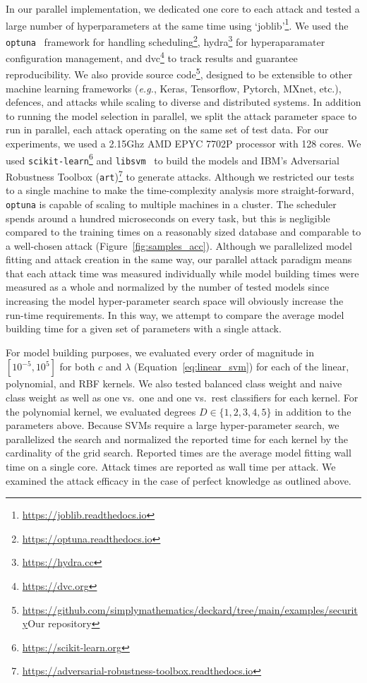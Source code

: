 \documentclass[fonts]{icst}
\begin{document}
In our parallel implementation, we dedicated one core to each attack and tested a large number of hyperparameters at the same time using `joblib'\footnote{\href{https://joblib.readthedocs.io}{https://joblib.readthedocs.io}}. We used the \texttt{optuna}~\cite{optuna} framework for handling scheduling\footnote{\href{https://optuna.readthedocs.io}{https://optuna.readthedocs.io}}, hydra\footnote{\href{https://hydra.cc}{https://hydra.cc}} for hyperaparamater configuration management, and dvc\footnote{\href{https://dvc.org}{https://dvc.org}} to track results and guarantee reproducibility. We also provide source code\footnote{\href{https://github.com/simplymathematics/deckard/}{https://github.com/simplymathematics/deckard/tree/main/examples/security}{Our repository}}, designed to be extensible to other machine learning frameworks (\textit{e.g.}, Keras, Tensorflow, Pytorch, MXnet, etc.), defences, and attacks while scaling to diverse and distributed systems. In addition to running the model selection in parallel, we split the attack parameter space to run in parallel, each attack operating on the same set of test data. For our experiments, we used a 2.15Ghz AMD EPYC 7702P processor with 128 cores. We used \texttt{scikit-learn}\footnote{\href{https://scikit-learn.org/}{https://scikit-learn.org}} and \texttt{libsvm}~\cite{chang2011libsvm} to build the models and IBM's Adversarial Robustness Toolbox (\texttt{art})\footnote{\href{https://adversarial-robustness-toolbox.readthedocs.io/}{https://adversarial-robustness-toolbox.readthedocs.io}} to generate attacks.  Although we restricted our tests to a single machine to make the time-complexity analysis more straight-forward, \texttt{optuna} is capable of scaling to multiple machines in a cluster. The scheduler spends around a hundred microseconds on every task, but this is negligible compared to the training times on a reasonably sized database and comparable to a well-chosen attack (Figure~\ref{fig:samples_acc}). Although we parallelized model fitting and attack creation in the same way, our parallel attack paradigm means that each attack time was measured individually while model building times were measured as a whole and normalized by the number of tested models since increasing the model hyper-parameter search space will obviously increase the run-time requirements. In this way, we attempt to compare the average model building time for a given set of parameters with a single attack.

For model building purposes, we evaluated every order of magnitude in $[10^{-5}, 10^5]$ for both $c$  and $\lambda$ (Equation~\ref{eq:linear_svm}) for each of the linear, polynomial, and RBF kernels. We also tested balanced class weight and naive class weight as well as one vs.~one and one vs.~rest classifiers for each kernel. For the polynomial kernel, we evaluated degrees $D\in\{1,2,3,4,5\}$ in addition to the parameters above. Because SVMs require a large hyper-parameter search, we parallelized the search and normalized the reported time for each kernel by the cardinality of the grid search. Reported times are the average model fitting  wall time on a single core. Attack times are reported as wall time per attack. We examined the attack efficacy in the case of perfect knowledge as outlined above.
\end{document}
